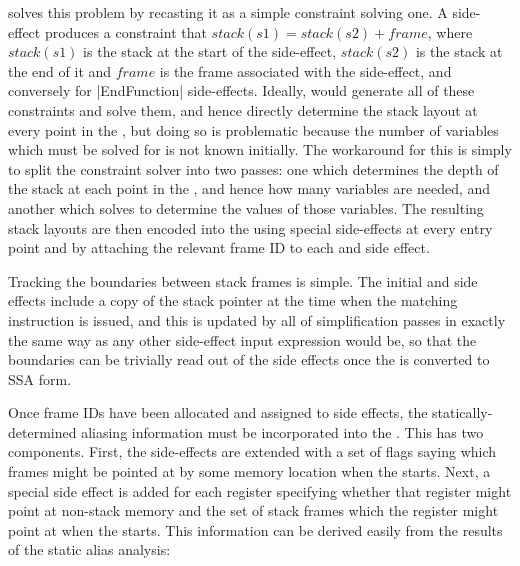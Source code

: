 {\Technique} solves this problem by recasting it as a simple
constraint solving one.  A  side-effect
produces a constraint that $stack(s1) = stack(s2) + frame$, where
$stack(s1)$ is the stack at the start of the side-effect, $stack(s2)$
is the stack at the end of it and $frame$ is the frame associated with
the side-effect, and conversely for \state|EndFunction| side-effects.
Ideally, {\Technique} would generate all of these constraints and
solve them, and hence directly determine the stack layout at every
point in the {\StateMachine}, but doing so is problematic because the
number of variables which must be solved for is not known initially.
The workaround for this is simply to split the constraint solver into
two passes: one which determines the depth of the stack at each point
in the \StateMachine, and hence how many variables are needed, and
another which solves to determine the values of those variables.  The
resulting stack layouts are then encoded into the \StateMachine using
special  side-effects at every entry point and by
attaching the relevant frame ID to each  and
 side effect.

Tracking the boundaries between stack frames is simple.  The initial
 and  side effects include a
copy of the stack pointer at the time when the matching instruction is
issued, and this is updated by all of {\StateMachine} simplification
passes in exactly the same way as any other side-effect input
expression would be, so that the boundaries can be trivially read out
of the side effects once the {\StateMachine} is converted to SSA form.


Once frame IDs have been allocated and assigned to side effects, the
statically-determined aliasing information must be incorporated into
the \StateMachine.  This has two components.  First, the
 side-effects are extended with a set of flags
saying which frames might be pointed at by some memory location when
the {\StateMachine} starts.  Next, a special 
side effect is added for each register specifying whether that
register might point at non-stack memory and the set of stack frames
which the register might point at when the {\StateMachine} starts.
This information can be derived easily from the results of the static
alias analysis:

